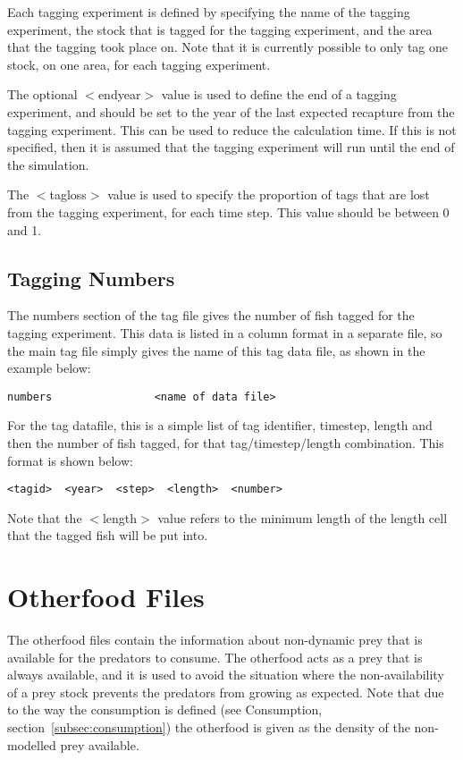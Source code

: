 \documentclass [a4paper, 10pt]{book}
\begin{document}
Each tagging experiment is defined by specifying the name of the tagging experiment, the stock that is tagged for the tagging experiment, and the area that the tagging took place on.  Note that it is currently possible to only tag one stock, on one area, for each tagging experiment.

\bigskip
The optional $<$endyear$>$ value is used to define the end of a tagging experiment, and should be set to the year of the last expected recapture from the tagging experiment.  This can be used to reduce the calculation time.  If this is not specified, then it is assumed that the tagging experiment will run until the end of the simulation.

\bigskip
The $<$tagloss$>$ value is used to specify the proportion of tags that are lost from the tagging experiment, for each time step.  This value should be between 0 and 1.

\section{Tagging Numbers}\label{sec:tagnumbers}
The numbers section of the tag file gives the number of fish tagged for the tagging experiment.  This data is listed in a column format in a separate file, so the main tag file simply gives the name of this tag data file, as shown in the example below:

{\small\begin{verbatim}
numbers                <name of data file>
\end{verbatim}}

For the tag datafile, this is a simple list of tag identifier, timestep, length and then the number of fish tagged, for that tag/timestep/length combination.  This format is shown below:

{\small\begin{verbatim}
<tagid>  <year>  <step>  <length>  <number>
\end{verbatim}}

Note that the $<$length$>$ value refers to the minimum length of the length cell that the tagged fish will be put into.

\chapter{Otherfood Files}\label{chap:other}
The otherfood files contain the information about non-dynamic prey that is available for the predators to consume.  The otherfood acts as a prey that is always available, and it is used to avoid the situation where the non-availability of a prey stock prevents the predators from growing as expected.  Note that due to the way the consumption is defined (see Consumption, section~\ref{subsec:consumption}) the otherfood is given as the density of the non-modelled prey available.
\end{document}
